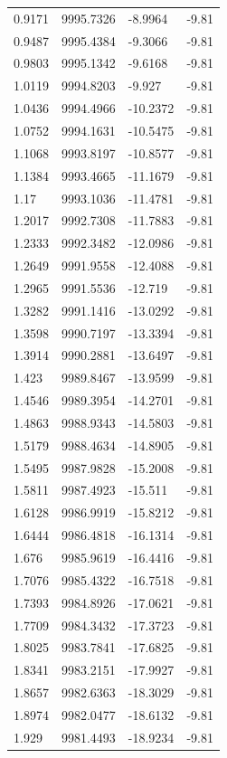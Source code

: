 \begin{table}[H]
\begin{tabular}{llll}
0.9171 & 9995.7326 & -8.9964 & -9.81 \\
0.9487 & 9995.4384 & -9.3066 & -9.81 \\
0.9803 & 9995.1342 & -9.6168 & -9.81 \\
1.0119 & 9994.8203 & -9.927 & -9.81 \\
1.0436 & 9994.4966 & -10.2372 & -9.81 \\
1.0752 & 9994.1631 & -10.5475 & -9.81 \\
1.1068 & 9993.8197 & -10.8577 & -9.81 \\
1.1384 & 9993.4665 & -11.1679 & -9.81 \\
1.17 & 9993.1036 & -11.4781 & -9.81 \\
1.2017 & 9992.7308 & -11.7883 & -9.81 \\
1.2333 & 9992.3482 & -12.0986 & -9.81 \\
1.2649 & 9991.9558 & -12.4088 & -9.81 \\
1.2965 & 9991.5536 & -12.719 & -9.81 \\
1.3282 & 9991.1416 & -13.0292 & -9.81 \\
1.3598 & 9990.7197 & -13.3394 & -9.81 \\
1.3914 & 9990.2881 & -13.6497 & -9.81 \\
1.423 & 9989.8467 & -13.9599 & -9.81 \\
1.4546 & 9989.3954 & -14.2701 & -9.81 \\
1.4863 & 9988.9343 & -14.5803 & -9.81 \\
1.5179 & 9988.4634 & -14.8905 & -9.81 \\
1.5495 & 9987.9828 & -15.2008 & -9.81 \\
1.5811 & 9987.4923 & -15.511 & -9.81 \\
1.6128 & 9986.9919 & -15.8212 & -9.81 \\
1.6444 & 9986.4818 & -16.1314 & -9.81 \\
1.676 & 9985.9619 & -16.4416 & -9.81 \\
1.7076 & 9985.4322 & -16.7518 & -9.81 \\
1.7393 & 9984.8926 & -17.0621 & -9.81 \\
1.7709 & 9984.3432 & -17.3723 & -9.81 \\
1.8025 & 9983.7841 & -17.6825 & -9.81 \\
1.8341 & 9983.2151 & -17.9927 & -9.81 \\
1.8657 & 9982.6363 & -18.3029 & -9.81 \\
1.8974 & 9982.0477 & -18.6132 & -9.81 \\
1.929 & 9981.4493 & -18.9234 & -9.81 \\

\end{tabular}
\end{table}
